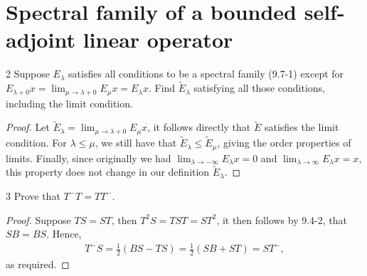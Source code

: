 \section{Spectral family of a bounded self-adjoint linear operator}


\begin{exercise}{2}
Suppose $E_\lambda$ satisfies all conditions to be a spectral family (9.7-1) except for $E_{\lambda + 0} x = \lim_{\mu \to \lambda + 0} E_\mu x = E_\lambda x$.
Find $\tilde{E}_\lambda$ satisfying all those conditions, including the limit condition.
\end{exercise}
\begin{proof}
Let $\tilde{E}_\lambda = \lim_{\mu \to \lambda + 0} E_\mu x$, it follows directly that $\tilde{E}$ satisfies the limit condition. 
For $\lambda \leq \mu$, we still have that $\tilde{E}_\lambda \leq \tilde{E}_\mu$, giving the order properties of limits. 
Finally, since originally we had $\lim_{\lambda \to -\infty} E_\lambda x = 0$ and $\lim_{\lambda \to \infty} E_\lambda x = x$, this property does not change in our definition $\tilde{E}_\lambda$.
\end{proof}

\begin{exercise}{3}
Prove that $T^- T = T T^-$.
\end{exercise}
\begin{proof}
Suppose $TS = ST$, then $T^2 S = T S T = S T^2$, it then follows by 9.4-2, that $SB = BS$.
Hence, 
\begin{align*}
    T^- S
    = \frac{1}{2} (BS - TS)
    = \frac{1}{2} (SB + ST)
    = ST^-,
\end{align*}
as required.
\end{proof} 

